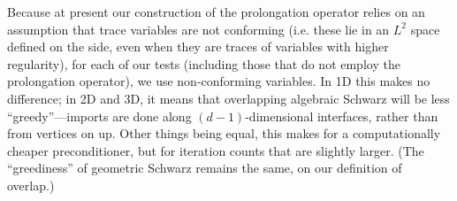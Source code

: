 \documentclass[11pt]{amsart}
\begin{document}
Because at present our construction of the prolongation operator relies on an assumption that trace variables are not conforming (i.e. these lie in an $L^2$ space defined on the side, even when they are traces of variables with higher regularity), for each of our tests (including those that do not employ the prolongation operator), we use non-conforming variables.  In 1D this makes no difference; in 2D and 3D, it means that overlapping algebraic Schwarz will be less ``greedy''---imports are done along $(d-1)$-dimensional interfaces, rather than from vertices on up.  Other things being equal, this makes for a computationally cheaper preconditioner, but for iteration counts that are slightly larger.  (The ``greediness'' of geometric Schwarz remains the same, on our definition of overlap.)

\newcommand{\plotscaling}{1.1}
\newcommand{\meshwidthindex}{4}
\newcommand{\iterationcountindex}{6}
\newcommand{\maxmyrows}{2000}
\newcommand{\PoissonOneDNthPoint}{5} %
\newcommand{\PoissonTwoDNthPoint}{3} %
\newcommand{\PoissonThreeDNthPoint}{2} %
\newcommand{\PoissonOneDStride}{45}
\newcommand{\PoissonTwoDStride}{12}
\newcommand{\PoissonTwoDStrideGMG}{18}
\newcommand{\PoissonThreeDStride}{6}
\newcommand{\PoissonOneDSchwarzAlgebraicStart}{320} %
\newcommand{\PoissonOneDSchwarzGeometricStart}{455}
\newcommand{\PoissonOneDGMGSchwarzAlgebraicStart}{50} %
\newcommand{\PoissonOneDGMGSchwarzGeometricStart}{185}
\newcommand{\PoissonTwoDSchwarzAlgebraicStart}{87} %
\newcommand{\PoissonTwoDSchwarzGeometricStart}{123}
\newcommand{\PoissonTwoDGMGSchwarzAlgebraicStart}{3} %
\newcommand{\PoissonTwoDGMGSchwarzGeometricStart}{55}
\newcommand{\PoissonThreeDSchwarzAlgebraicStart}{32} %
\newcommand{\PoissonThreeDSchwarzGeometricStart}{44}
\newcommand{\PoissonThreeDGMGSchwarzAlgebraicStart}{8} %
\newcommand{\PoissonThreeDGMGSchwarzGeometricStart}{20}

\end{document}
